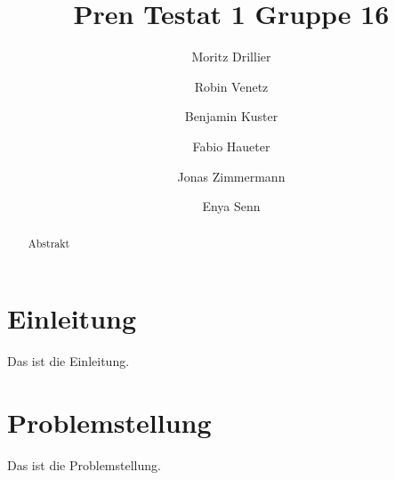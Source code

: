 \documentclass{article}
\title{Pren Testat 1 Gruppe 16}
\author{Moritz Drillier \and Robin Venetz \and Benjamin Kuster \and Fabio Haueter \and Jonas Zimmermann \and Enya Senn}
\date{\thedate}
\begin{document}
\maketitle

\tableofcontents 

\begin{abstract}
Abstrakt
\end{abstract}

\section{Einleitung}
Das ist die Einleitung.
\section{Problemstellung}
Das ist die Problemstellung.
\end{document}
